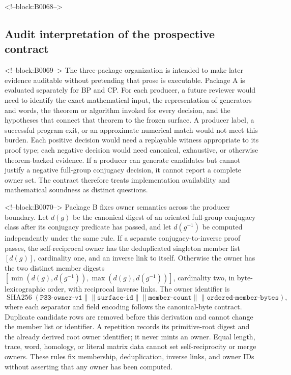 \documentclass[11pt,a4paper]{article}
\begin{document}
<!--block:B0068-->
\subsection{Audit interpretation of the prospective contract}

<!--block:B0069-->
The three-package organization is intended to make later evidence auditable without pretending that prose is executable. Package A is evaluated separately for BP and CP. For each producer, a future reviewer would need to identify the exact mathematical input, the representation of generators and words, the theorem or algorithm invoked for every decision, and the hypotheses that connect that theorem to the frozen surface. A producer label, a successful program exit, or an approximate numerical match would not meet this burden. Each positive decision would need a replayable witness appropriate to its proof type; each negative decision would need canonical, exhaustive, or otherwise theorem-backed evidence. If a producer can generate candidates but cannot justify a negative full-group conjugacy decision, it cannot report a complete owner set. The contract therefore treats implementation availability and mathematical soundness as distinct questions.

<!--block:B0070-->
Package B fixes owner semantics across the producer boundary. Let \(d(g)\) be the canonical digest of an oriented full-group conjugacy class after its conjugacy predicate has passed, and let \(d(g^{-1})\) be computed independently under the same rule. If a separate conjugacy-to-inverse proof passes, the self-reciprocal owner has the deduplicated singleton member list \([d(g)]\), cardinality one, and an inverse link to itself. Otherwise the owner has the two distinct member digests \([\min(d(g),d(g^{-1})),\max(d(g),d(g^{-1}))]\), cardinality two, in byte-lexicographic order, with reciprocal inverse links. The owner identifier is
\[
 \operatorname{SHA256}(\texttt{P33-owner-v1}\mathbin{\|\!\|}\texttt{surface-id}\mathbin{\|\!\|}\texttt{member-count}\mathbin{\|\!\|}\texttt{ordered-member-bytes}),
\]
where each separator and field encoding follows the canonical-byte contract. Duplicate candidate rows are removed before this derivation and cannot change the member list or identifier. A repetition records its primitive-root digest and the already derived root owner identifier; it never mints an owner. Equal length, trace, word, homology, or literal matrix data cannot set self-reciprocity or merge owners. These rules fix membership, deduplication, inverse links, and owner IDs without asserting that any owner has been computed.
\end{document}
